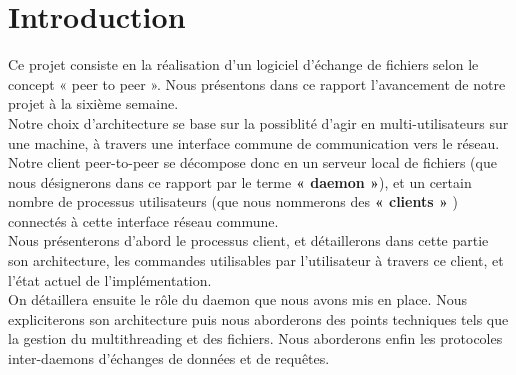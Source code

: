 \chapter{Introduction}
	Ce projet consiste en la réalisation d'un logiciel d'échange de fichiers 
	selon le concept « peer to peer ». Nous présentons dans ce rapport 
	l'avancement de notre projet à la sixième semaine.\\
	
	Notre choix d'architecture se base sur la possiblité d'agir en multi-utilisateurs 
	sur une machine, à travers une interface commune de communication vers le réseau.
	Notre client peer-to-peer se décompose donc en un serveur local de fichiers 
	(que nous désignerons dans ce rapport par le terme \textbf{« daemon »}), et un certain 
	nombre de processus utilisateurs (que nous nommerons des \textbf{« clients »} )
	connectés à cette interface réseau commune.\\
	
	Nous présenterons d'abord le processus client, et détaillerons dans cette partie son 
	architecture, les commandes utilisables par l'utilisateur à travers ce client, et
	l'état actuel de l'implémentation.\\
	
	On détaillera ensuite le rôle du daemon que nous avons mis en place.
	Nous expliciterons son architecture puis nous aborderons des points 
	techniques tels que la gestion du multithreading et des fichiers. Nous 
	aborderons enfin les protocoles inter-daemons d'échanges de données et 
	de requêtes. 
